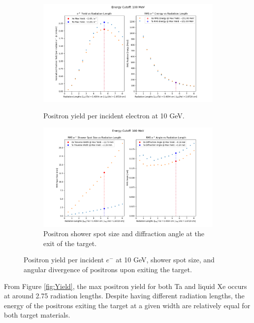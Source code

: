 \documentclass[%
reprint,
amsmath, amssymb,
aps,
floatfix,
]{revtex4-2}
\begin{document}

\begin{figure}[H]
    \begin{subfigure}{.5\textwidth}
        \includegraphics[height = .5\linewidth]{../images/CompYield.png}
        \caption{\label{fig:Yield} Positron yield per incident electron at 10 GeV.}
        \includegraphics[height = .5\linewidth]{../images/CompATW.png}
        \caption{\label{fig:ATW}Positron shower spot size and diffraction angle at the exit of the target.}
    \end{subfigure}
    \caption{\label{fig:Comps}Positron yield per incident $e^-$ at 10 GeV, 
    shower spot size, and angular divergence of positrons upon exiting the target.}
\end{figure}
From Figure \ref{fig:Yield}, the max positron yield for both Ta and liquid Xe occurs at around 2.75 radiation lengths.
Despite having different radiation lengths, the energy of the positrons exiting the
target at a given width are relatively equal for both target materials.
\end{document}
